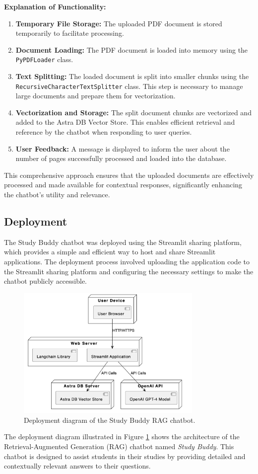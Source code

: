 \textbf{Explanation of Functionality:}
\begin{enumerate}
    \item \textbf{Temporary File Storage:} The uploaded PDF document is stored temporarily to facilitate processing.
    \item \textbf{Document Loading:} The PDF document is loaded into memory using the \texttt{PyPDFLoader} class.
    \item \textbf{Text Splitting:} The loaded document is split into smaller chunks using the \texttt{RecursiveCharacterTextSplitter} class. This step is necessary to manage large documents and prepare them for vectorization.
    \item \textbf{Vectorization and Storage:} The split document chunks are vectorized and added to the Astra DB Vector Store. This enables efficient retrieval and reference by the chatbot when responding to user queries.
    \item \textbf{User Feedback:} A message is displayed to inform the user about the number of pages successfully processed and loaded into the database.
\end{enumerate}

This comprehensive approach ensures that the uploaded documents are effectively processed and made available for contextual responses, significantly enhancing the chatbot's utility and relevance.

\subsection{Deployment}
The Study Buddy chatbot was deployed using the Streamlit sharing platform, which provides a simple and efficient way to host and share Streamlit applications. The deployment process involved uploading the application code to the Streamlit sharing platform and configuring the necessary settings to make the chatbot publicly accessible.
\begin{figure}[H]
    \centering
    \includegraphics[width=0.8\textwidth]{figs/deployment.png}
    \caption{Deployment diagram of the Study Buddy RAG chatbot.}
    \label{fig:deployment}
\end{figure}
The deployment diagram illustrated in Figure \ref{fig:deployment} shows the architecture of the Retrieval-Augmented Generation (RAG) chatbot named \textit{Study Buddy}. This chatbot is designed to assist students in their studies by providing detailed and contextually relevant answers to their questions.

